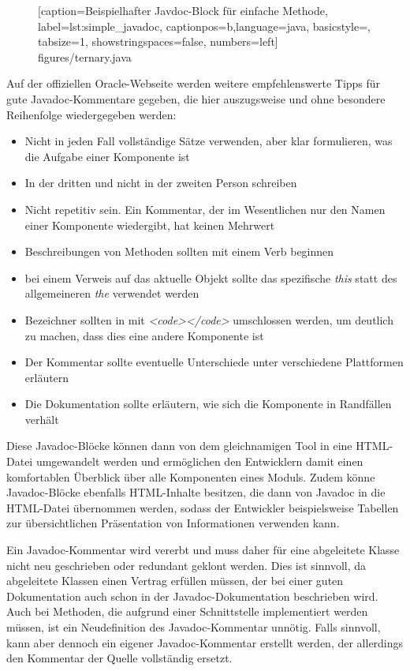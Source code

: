 		\begin{figure}
			
			[caption={Beispielhafter Javdoc-Block für einfache Methode},
			label={lst:simple_javadoc},
			captionpos=b,language=java, basicstyle=\footnotesize, tabsize=1, showstringspaces=false,  numbers=left]
			{figures/ternary.java}
		\end{figure}

Auf der offiziellen Oracle-Webseite werden weitere empfehlenswerte Tipps für gute Javadoc-Kommentare gegeben, die hier auszugsweise und ohne besondere Reihenfolge wiedergegeben werden\cite{HowtoWriteDocCommentsfortheJavadocTool}:
\begin{itemize}
    \item Nicht in jeden Fall vollständige Sätze verwenden, aber klar formulieren, was die Aufgabe einer Komponente ist
    \item In der dritten und nicht in der zweiten Person schreiben
    \item Nicht repetitiv sein. Ein Kommentar, der im Wesentlichen nur den Namen einer Komponente wiedergibt, hat keinen Mehrwert
    \item  Beschreibungen von Methoden sollten mit einem Verb beginnen
    \item bei einem Verweis auf das aktuelle Objekt sollte das spezifische \textit{this} statt des allgemeineren \textit{the} verwendet werden
    \item Bezeichner sollten in mit \textit{<code></code>} umschlossen werden, um deutlich zu machen, dass dies eine andere Komponente ist
    \item Der Kommentar sollte eventuelle Unterschiede unter verschiedene Plattformen erläutern
    \item Die Dokumentation sollte erläutern, wie sich die Komponente in Randfällen verhält
    
\end{itemize}
Diese Javadoc-Blöcke können dann von dem gleichnamigen Tool in eine HTML-Datei umgewandelt werden und ermöglichen den Entwicklern damit einen komfortablen Überblick über alle Komponenten eines Moduls. Zudem könne Javadoc-Blöcke ebenfalls HTML-Inhalte besitzen, die dann von Javadoc in die HTML-Datei übernommen werden, sodass der Entwickler beispielsweise Tabellen zur übersichtlichen Präsentation  von Informationen verwenden kann.

Ein Javadoc-Kommentar wird vererbt und muss daher für eine abgeleitete Klasse nicht neu geschrieben oder redundant geklont werden. Dies ist sinnvoll, da abgeleitete Klassen einen Vertrag erfüllen müssen, der bei einer guten Dokumentation auch schon in der Javadoc-Dokumentation beschrieben wird. Auch bei Methoden, die aufgrund einer Schnittstelle implementiert werden müssen, ist ein Neudefinition des Javadoc-Kommentar unnötig. Falls sinnvoll, kann aber dennoch ein eigener Javadoc-Kommentar erstellt werden, der allerdings den Kommentar der Quelle vollständig ersetzt. 

